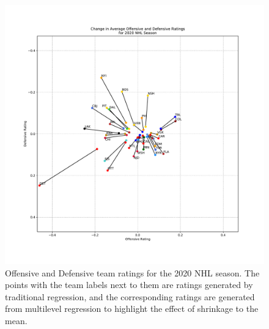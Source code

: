 \documentclass{uofsthesis-cs}
\begin{document}
\begin{appendices}
\begin{figure}
	\includegraphics[width=\textwidth]{figures/ratings_nhl.pdf}
	\caption{Offensive and Defensive team ratings for the 2020 NHL season. The points with the team labels next to them are ratings generated by traditional regression, and the corresponding ratings are generated from multilevel regression to highlight the effect of shrinkage to the mean.}
\end{figure}


\end{appendices}
\end{document}
